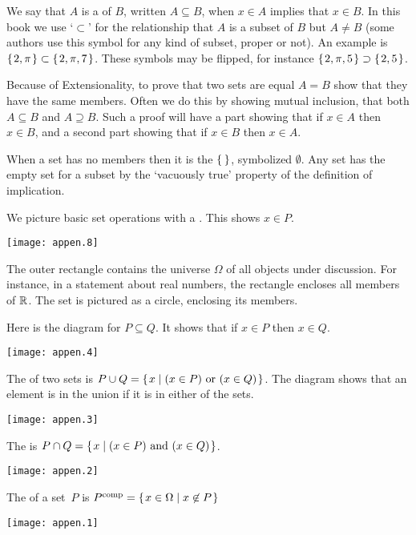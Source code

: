 We say that \( A \) is a  of \( B \), written
$A\subseteq B$, when $x\in A$ implies that $x\in B$.
In this book we use
`\( \subset \)' for the  %
relationship that \( A \) is a subset of \( B \) but \( A\neq B \)
(some authors use this symbol for any kind of subset, proper or not).
An example is 
\( \mbox{$\{\hspace{0.1em}2,\pi\hspace{0.1em}\}$}\subset\mbox{$\{\hspace{0.1em}2,\pi,7\hspace{0.1em}\}$} \).
These symbols may be flipped, for instance
\( \mbox{$\{\hspace{0.1em} 2,\pi,5\hspace{0.1em}\}$}\supset\mbox{$\{\hspace{0.1em}2,5\hspace{0.1em}\}$} \).

Because of Extensionality, to prove that two sets are equal \( A=B \)
show that they have the same members.
Often we do this by showing mutual inclusion,%
that both \( A\subseteq B \) and \( A\supseteq B \).
Such a proof will have a part showing that if $x\in A$ then $x\in B$,
and a second part showing that if $x\in B$ then $x\in A$.

When a set has no members then it is
the  \( \set{} \),
symbolized \( \emptyset \).
Any set has the empty set for a subset by the `vacuously true'
property of the definition of implication.




We picture basic set operations with a
.
This shows \( x\in P \). 
\begin{center}
  \texttt{[image: appen.8]}
\end{center}
The outer rectangle contains the universe $\Omega$ of all objects under 
discussion.
For instance, in a statement about real numbers, the rectangle encloses all 
members of $\mathbb{R}$.
The set is pictured as a circle, enclosing its members.

Here is the diagram for \( P\subseteq Q \).
It shows that if \( x\in P \) then \( x\in Q \).
\begin{center}
  \texttt{[image: appen.4]}
\end{center}




The  of two sets is
\( P\cup Q=\mbox{$\{\hspace{0.1em}x\mid \text{$(x\in P)$ or $(x\in Q)$}\hspace{0.1em}\}$} \).
The diagram shows that an element is in the union if it is in either of the
sets.
\begin{center}
  \texttt{[image: appen.3]}
\end{center}
The  is
\( P\cap Q=\mbox{$\{\hspace{0.1em}x\mid \text{$(x\in P)$ and $(x\in Q)$}\hspace{0.1em}\}$} \).
\begin{center}
  \texttt{[image: appen.2]}
\end{center}
The 
of a set~\( P \) is
\( P^{\text{comp}}=\mbox{$\{\hspace{0.1em}x\in\Omega\mid x\not\in P\hspace{0.1em}\}$} \)
\begin{center}
  \texttt{[image: appen.1]}
\end{center}




